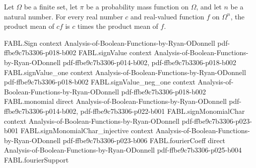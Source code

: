 \begin{theorem}
\label{FABL.productMean_smul}
\leanok
{}
Let $\Omega$ be a finite set, let $\pi$ be a probability mass function on $\Omega$,
and let $n$ be a natural number. For every real number $c$ and real-valued function
$f$ on $\Omega^n$, the product mean of $cf$ is $c$ times the product mean of $f$.
\end{theorem}

\begin{theorem}
\label{FABL.FiniteFourierBasis.productInfluence_eq_two_mul_resamplingDisagreement}
\leanok
{}
\proofstep
  {FABL.Sign}
  {context}
  {Analysis-of-Boolean-Functions-by-Ryan-ODonnell}
  {pdf-ffbe9c7b3306-p018-b002}
\proofstep
  {FABL.signValue}
  {context}
  {Analysis-of-Boolean-Functions-by-Ryan-ODonnell}
  {pdf-ffbe9c7b3306-p014-b002,
    pdf-ffbe9c7b3306-p018-b002}
\proofstep
  {FABL.signValue_one}
  {context}
  {Analysis-of-Boolean-Functions-by-Ryan-ODonnell}
  {pdf-ffbe9c7b3306-p018-b002}
\proofstep
  {FABL.signValue_neg_one}
  {context}
  {Analysis-of-Boolean-Functions-by-Ryan-ODonnell}
  {pdf-ffbe9c7b3306-p018-b002}
\proofstep
  {FABL.monomial}
  {direct}
  {Analysis-of-Boolean-Functions-by-Ryan-ODonnell}
  {pdf-ffbe9c7b3306-p014-b002,
    pdf-ffbe9c7b3306-p022-b001}
\proofstep
  {FABL.signMonomialChar}
  {context}
  {Analysis-of-Boolean-Functions-by-Ryan-ODonnell}
  {pdf-ffbe9c7b3306-p023-b001}
\proofstep
  {FABL.signMonomialChar_injective}
  {context}
  {Analysis-of-Boolean-Functions-by-Ryan-ODonnell}
  {pdf-ffbe9c7b3306-p023-b006}
\proofstep
  {FABL.fourierCoeff}
  {direct}
  {Analysis-of-Boolean-Functions-by-Ryan-ODonnell}
  {pdf-ffbe9c7b3306-p025-b004}
\proofstep
  {FABL.fourierSupport}

\end{theorem}
